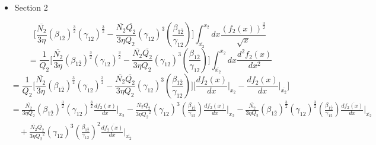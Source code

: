 \documentclass[fleqn, 10pt]{article}
\begin{document}
            \begin{itemize}
            \item Section 2
            \end{itemize}
            \begin{equation}
            \Biggl[ \frac{\overline{N_2}}{3 \eta} (\beta_{1\overline{2}})^\frac{3}{2} (\gamma_{12})^\frac{3}{2} - \frac{\overline{N_2} \overline{Q_2}}{3 \eta Q_2} (\gamma_{12})^3 \left(\frac{\beta_{1\overline{2}}}{\gamma_{12}}\right) \Biggr] \int^{x_2}_{\overline{x_2}} dx \frac{(f_2(x))^\frac{3}{2}}{\sqrt{x}}
            \label{98}
            \end{equation}
            \begin{equation*}
            = \frac{1}{Q_2} \Biggl[ \frac{\overline{N_2}}{3 \eta} (\beta_{1\overline{2}})^\frac{3}{2} (\gamma_{12})^\frac{3}{2} - \frac{\overline{N_2} \overline{Q_2}}{3 \eta Q_2} (\gamma_{12})^3 \left(\frac{\beta_{1\overline{2}}}{\gamma_{12}}\right) \Biggr] \int^{x_2}_{\overline{x_2}} dx \frac{d^2f_2(x)}{dx^2} 
            \end{equation*}
            \begin{equation*}
            = \frac{1}{Q_2} \Biggl[ \frac{\overline{N_2}}{3 \eta} (\beta_{1\overline{2}})^\frac{3}{2} (\gamma_{12})^\frac{3}{2} -   \frac{\overline{N_2} \overline{Q_2}}{3 \eta Q_2} (\gamma_{12})^3 \left(\frac{\beta_{1\overline{2}}}{\gamma_{12}}\right) \Biggr] \biggl[ \frac{df_2(x)}{dx} \Bigg|_{x_2} -   \frac{df_2(x)}{dx} \Bigg|_{\overline{x_2}} \biggr] 
            \end{equation*}
            \begin{equation}
            \begin{split}
            &=   \frac{\overline{N_2}}{3 \eta Q_2} (\beta_{1\overline{2}})^\frac{3}{2} (\gamma_{12})^\frac{3}{2} \frac{df_2(x)}{dx} \Bigg|_{x_2} -   \frac{\overline{N_2} \overline{Q_2}}{3 \eta {Q_2}^2} (\gamma_{12})^3 \left(\frac{\beta_{1\overline{2}}}{\gamma_{12}}\right) \frac{df_2(x)}{dx} \Bigg|_{x_2}  -  \frac{\overline{N_2}}{3 \eta Q_2} (\beta_{1\overline{2}})^\frac{3}{2} (\gamma_{12})^\frac{3}{2} \left(\frac{\beta_{1\overline{2}}}{\gamma_{12}}\right) \frac{d\overline{f_2(x)}}{dx} \Bigg|_{\overline{x_2}} \\ & \quad +   \frac{\overline{N_2} \overline{Q_2}}{3 \eta {Q_2}^2} (\gamma_{12})^3 \left(\frac{\beta_{1\overline{2}}}{\gamma_{12}}\right)^2 \frac{d\overline{f_2(x)}}{dx} \Bigg|_{\overline{x_2}}
            \label{99}
            \end{split}
            \end{equation}
\end{document}
